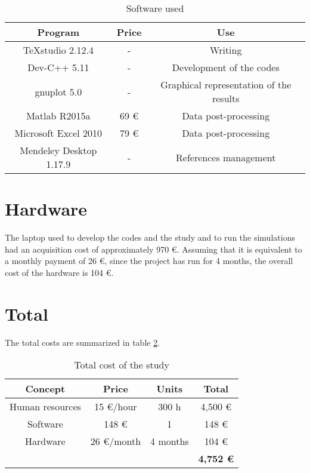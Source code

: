\begin{table}[H]
	\centering
	\begin{tabular}{ |c|c|c| }
		\hline
		Program & Price & Use \\ \hline
		TeXstudio 2.12.4 & - & Writing \\ \hline
		Dev-C++ 5.11 & - & Development of the codes \\ \hline
		gnuplot 5.0 & - & Graphical representation of the results \\ \hline
		Matlab R2015a & 69 € & Data post-processing \\ \hline
		Microsoft Excel 2010 & 79 € & Data post-processing \\ \hline
		Mendeley Desktop 1.17.9 & - & References management \\ \hline
	\end{tabular}
\caption{Software used}
\label{softw}
\end{table}

\section{Hardware}
The laptop used to develop the codes and the study and to run the simulations had an acquisition cost of approximately 970 €. Assuming that it is equivalent to a monthly payment of 26 €, since the project has run for 4 months, the overall cost of the hardware is 104 €.

\section{Total}
The total costs are summarized in table \ref{TotalCost}.
\begin{table}[H]
	\centering
	\begin{tabular}{ccc|c|}
		\hline
		\multicolumn{1}{|c|}{Concept}         & \multicolumn{1}{c|}{Price}         & Units    & Total               \\ \hline
		\multicolumn{1}{|c|}{Human resources} & \multicolumn{1}{c|}{15 €/hour}     & 300 h    & 4,500 €             \\ \hline
		\multicolumn{1}{|c|}{Software}        & \multicolumn{1}{c|}{148 €}         & 1        & 148 €               \\ \hline
		\multicolumn{1}{|c|}{Hardware}        & \multicolumn{1}{c|}{26 €/month} & 4 months & 104 €            \\ \hline
		&                                    &          & \textbf{4,752 €} \\ \cline{4-4} 
	\end{tabular}
\caption{Total cost of the study}
\label{TotalCost}
\end{table}


